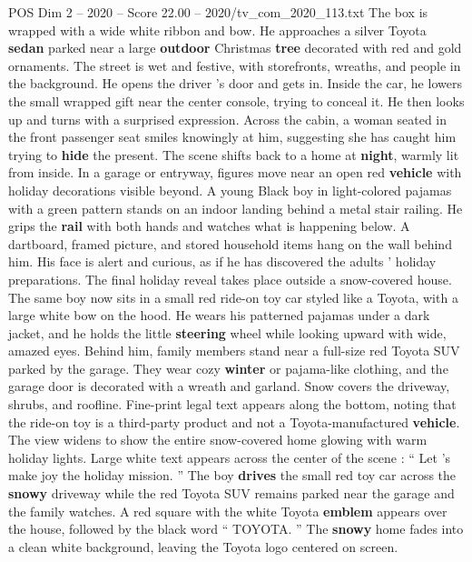 \begin{textsample}{POS Dim 2 – 2020 – Score 22.00 – 2020/tv\_com\_2020\_113.txt}
The box is wrapped with a wide white ribbon and bow.
He approaches a silver Toyota \textbf{sedan} parked near a large \textbf{outdoor} Christmas \textbf{tree} decorated with red and gold ornaments.
The street is wet and festive, with storefronts, wreaths, and people in the background.
He opens the driver ’s door and gets in.
Inside the car, he lowers the small wrapped gift near the center console, trying to conceal it.
He then looks up and turns with a surprised expression.
Across the cabin, a woman seated in the front passenger seat smiles knowingly at him, suggesting she has caught him trying to \textbf{hide} the present.
The scene shifts back to a home at \textbf{night}, warmly lit from inside.
In a garage or entryway, figures move near an open red \textbf{vehicle} with holiday decorations visible beyond.
A young Black boy in light-colored pajamas with a green pattern stands on an indoor landing behind a metal stair railing.
He grips the \textbf{rail} with both hands and watches what is happening below.
A dartboard, framed picture, and stored household items hang on the wall behind him.
His face is alert and curious, as if he has discovered the adults ’ holiday preparations.
The final holiday reveal takes place outside a snow-covered house.
The same boy now sits in a small red ride-on toy car styled like a Toyota, with a large white bow on the hood.
He wears his patterned pajamas under a dark jacket, and he holds the little \textbf{steering} wheel while looking upward with wide, amazed eyes.
Behind him, family members stand near a full-size red Toyota SUV parked by the garage.
They wear cozy \textbf{winter} or pajama-like clothing, and the garage door is decorated with a wreath and garland.
Snow covers the driveway, shrubs, and roofline.
Fine-print legal text appears along the bottom, noting that the ride-on toy is a third-party product and not a Toyota-manufactured \textbf{vehicle}.
The view widens to show the entire snow-covered home glowing with warm holiday lights.
Large white text appears across the center of the scene : “ Let ’s make joy the holiday mission. ” The boy \textbf{drives} the small red toy car across the \textbf{snowy} driveway while the red Toyota SUV remains parked near the garage and the family watches.
A red square with the white Toyota \textbf{emblem} appears over the house, followed by the black word “ TOYOTA. ” The \textbf{snowy} home fades into a clean white background, leaving the Toyota logo centered on screen.

\end{textsample}
